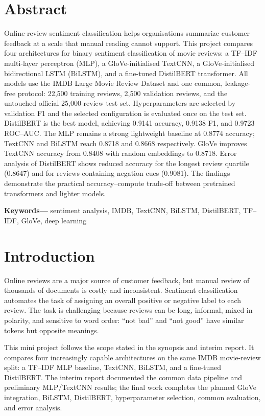 \documentclass[12pt,a4paper]{article}
\begin{document}
\section*{Abstract}
Online-review sentiment classification helps organisations summarize customer feedback at a scale that manual reading cannot support. This project compares four architectures for binary sentiment classification of movie reviews: a TF--IDF multi-layer perceptron (MLP), a GloVe-initialised TextCNN, a GloVe-initialised bidirectional LSTM (BiLSTM), and a fine-tuned DistilBERT transformer. All models use the IMDB Large Movie Review Dataset and one common, leakage-free protocol: 22,500 training reviews, 2,500 validation reviews, and the untouched official 25,000-review test set. Hyperparameters are selected by validation F1 and the selected configuration is evaluated once on the test set. DistilBERT is the best model, achieving 0.9141 accuracy, 0.9138 F1, and 0.9723 ROC--AUC. The MLP remains a strong lightweight baseline at 0.8774 accuracy; TextCNN and BiLSTM reach 0.8718 and 0.8668 respectively. GloVe improves TextCNN accuracy from 0.8408 with random embeddings to 0.8718. Error analysis of DistilBERT shows reduced accuracy for the longest review quartile (0.8647) and for reviews containing negation cues (0.9081). The findings demonstrate the practical accuracy--compute trade-off between pretrained transformers and lighter models.

\noindent\textbf{Keywords---} sentiment analysis, IMDB, TextCNN, BiLSTM, DistilBERT, TF--IDF, GloVe, deep learning

\tableofcontents
\newpage
{}

\section{Introduction}
Online reviews are a major source of customer feedback, but manual review of thousands of documents is costly and inconsistent. Sentiment classification automates the task of assigning an overall positive or negative label to each review. The task is challenging because reviews can be long, informal, mixed in polarity, and sensitive to word order: ``not bad'' and ``not good'' have similar tokens but opposite meanings.

This mini project follows the scope stated in the synopsis and interim report. It compares four increasingly capable architectures on the same IMDB movie-review split: a TF--IDF MLP baseline, TextCNN, BiLSTM, and a fine-tuned DistilBERT. The interim report documented the common data pipeline and preliminary MLP/TextCNN results; the final work completes the planned GloVe integration, BiLSTM, DistilBERT, hyperparameter selection, common evaluation, and error analysis.
\end{document}
